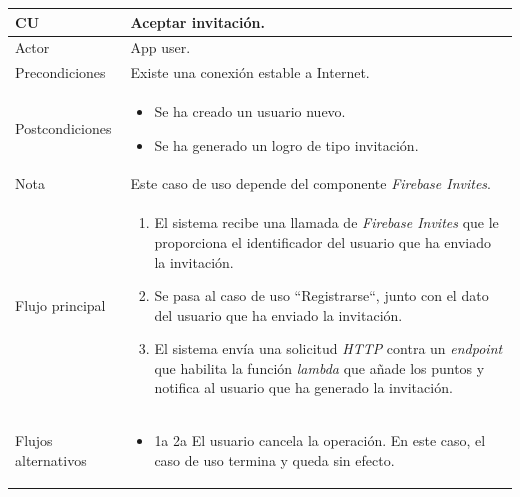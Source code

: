 \documentclass[twoside]{report}
\newcommand\addrow[2]{#1 &#2\\ }
\newcommand\addheading[2]{#1 &#2\\ \hline}
\newcommand\tabularhead{\begin{tabular}{lp{0.7\textwidth}}
\hline
}
\newenvironment{usecase}{\tabularhead}
{\hline\end{tabular}}
\begin{document}
\vspace{0.5cm}

\begin{usecase}
  \addheading{\textbf{CU\arabic{usecase}}}{Aceptar invitación.} 
  \addrow{Actor}{App user.}
  \addrow{Precondiciones}{Existe una conexión estable a Internet.}
  \addrow{Postcondiciones}{
  		\begin{itemize}
  		\item Se ha creado un usuario nuevo.
  		\item Se ha generado un logro de tipo invitación.
  		\end{itemize}
  }
  \addrow{Nota}{Este caso de uso depende del componente \textit{Firebase Invites}.}
  \addrow{Flujo principal}{
  		\begin{enumerate}
  		\item El sistema recibe una llamada de \textit{Firebase Invites} que le proporciona el identificador del usuario que ha enviado la invitación. %
  		\item Se pasa al caso de uso “Registrarse“, junto con el dato del usuario que ha enviado la invitación. %
  		\item El sistema envía una solicitud \textit{HTTP} contra un \textit{endpoint} que habilita la función \textit{lambda} que añade los puntos y notifica al usuario que ha generado la invitación. %
  		\end{enumerate}
  }
  \addrow{Flujos alternativos}{
  		\begin{itemize}
  		\item 1a 2a El usuario cancela la operación. En este caso, el caso de uso termina y queda sin efecto.
  		\end{itemize}
  }
\end{usecase}\\

\vspace{0.5cm}
\end{document}
